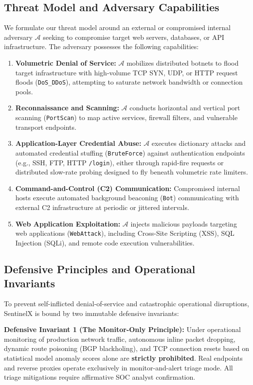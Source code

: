 \documentclass[conference]{IEEEtran}
\begin{document}
\subsection{Threat Model and Adversary Capabilities}
We formulate our threat model around an external or compromised internal adversary $\mathcal{A}$ seeking to compromise target web servers, databases, or API infrastructure. The adversary possesses the following capabilities:
\begin{enumerate}
    \item \textbf{Volumetric Denial of Service:} $\mathcal{A}$ mobilizes distributed botnets to flood target infrastructure with high-volume TCP SYN, UDP, or HTTP request floods (\texttt{DoS\_DDoS}), attempting to saturate network bandwidth or connection pools.
    \item \textbf{Reconnaissance and Scanning:} $\mathcal{A}$ conducts horizontal and vertical port scanning (\texttt{PortScan}) to map active services, firewall filters, and vulnerable transport endpoints.
    \item \textbf{Application-Layer Credential Abuse:} $\mathcal{A}$ executes dictionary attacks and automated credential stuffing (\texttt{BruteForce}) against authentication endpoints (e.g., SSH, FTP, HTTP \texttt{/login}), either through rapid-fire requests or distributed slow-rate probing designed to fly beneath volumetric rate limiters.
    \item \textbf{Command-and-Control (C2) Communication:} Compromised internal hosts execute automated background beaconing (\texttt{Bot}) communicating with external C2 infrastructure at periodic or jittered intervals.
    \item \textbf{Web Application Exploitation:} $\mathcal{A}$ injects malicious payloads targeting web applications (\texttt{WebAttack}), including Cross-Site Scripting (XSS), SQL Injection (SQLi), and remote code execution vulnerabilities.
\end{enumerate}

\subsection{Defensive Principles and Operational Invariants}
To prevent self-inflicted denial-of-service and catastrophic operational disruptions, SentinelX is bound by two immutable defensive invariants:

\textbf{Defensive Invariant 1 (The Monitor-Only Principle):} Under operational monitoring of production network traffic, autonomous inline packet dropping, dynamic route poisoning (BGP blackholing), and TCP connection resets based on statistical model anomaly scores alone are \textbf{strictly prohibited}. Real endpoints and reverse proxies operate exclusively in monitor-and-alert triage mode. All triage mitigations require affirmative SOC analyst confirmation.
\end{document}
